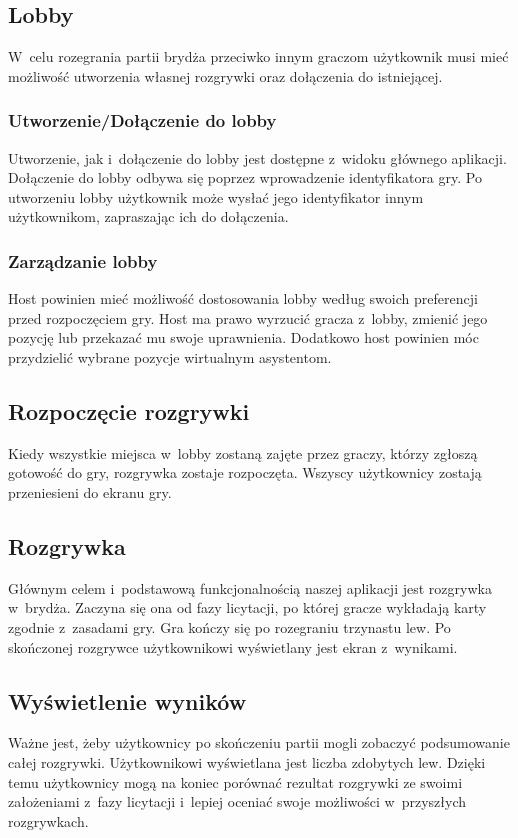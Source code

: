\subsection{Lobby}
W~celu rozegrania partii brydża przeciwko innym graczom
użytkownik musi mieć możliwość utworzenia własnej
rozgrywki oraz dołączenia do istniejącej.

\subsubsection{Utworzenie/Dołączenie do lobby}
Utworzenie, jak i~dołączenie do lobby jest dostępne z~widoku głównego aplikacji. Dołączenie do lobby
odbywa się poprzez wprowadzenie identyfikatora gry. Po utworzeniu lobby użytkownik może
wysłać jego identyfikator innym użytkownikom, zapraszając ich do dołączenia.

\subsubsection{Zarządzanie lobby}
Host powinien mieć możliwość dostosowania lobby według swoich preferencji przed
rozpoczęciem gry. Host ma prawo wyrzucić gracza z~lobby, zmienić jego pozycję lub przekazać
mu swoje uprawnienia. Dodatkowo host powinien móc przydzielić wybrane pozycje
wirtualnym asystentom.


\subsection{Rozpoczęcie rozgrywki}
Kiedy wszystkie miejsca w~lobby zostaną zajęte przez graczy, którzy zgłoszą gotowość do gry,
rozgrywka zostaje rozpoczęta.
Wszyscy użytkownicy zostają przeniesieni do ekranu gry.


\subsection{Rozgrywka}
Głównym celem i~podstawową funkcjonalnością naszej aplikacji jest
rozgrywka w~brydża. Zaczyna się ona od fazy licytacji, po której
gracze wykładają karty zgodnie z~zasadami gry. Gra kończy się po rozegraniu
trzynastu lew. Po skończonej rozgrywce użytkownikowi wyświetlany jest ekran z~wynikami.

\subsection{Wyświetlenie wyników}
Ważne jest, żeby użytkownicy po skończeniu partii mogli zobaczyć
podsumowanie całej rozgrywki. Użytkownikowi wyświetlana jest liczba
zdobytych lew. Dzięki temu użytkownicy mogą na koniec porównać rezultat rozgrywki
ze swoimi założeniami z~fazy licytacji i~lepiej oceniać swoje możliwości w~przyszłych rozgrywkach.


